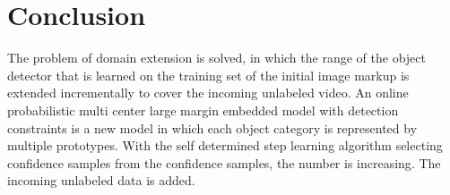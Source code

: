 \documentclass[30pt,twocolumn,letterpaper]{article}
\begin{document}
\section{Conclusion}
The problem of domain extension is solved, in which the range of the object detector that is learned on the training set of the initial image markup is extended incrementally to cover the incoming unlabeled video\cite{Li2007A}. An online probabilistic multi center large margin embedded model with detection constraints is a new model in which each object category is represented by multiple prototypes. With the self determined step learning algorithm selecting confidence samples from the confidence samples, the number is increasing\cite{Yi2008An}. The incoming unlabeled data is added.\\

{\small


}
\end{document}
